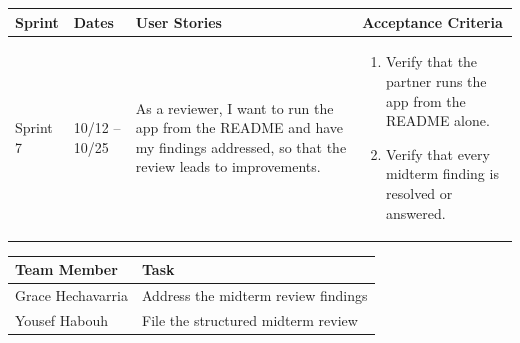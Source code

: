 \documentclass[12pt]{article}
\begin{document}
\noindent\begin{minipage}{\linewidth}

\vspace{0.5em}
\noindent
\begin{tabular}{|L{1.2cm}|L{1.8cm}|L{5.2cm}|L{6.3cm}|}
\hline
\textbf{Sprint} & \textbf{Dates} & \textbf{User Stories} & \textbf{Acceptance Criteria} \\
\hline
Sprint 7 & 10/12 -- 10/25 &
As a reviewer, I want to run the app from the README and have my findings addressed, so that the review leads to improvements. &
\begin{enumerate}
    \item Verify that the partner runs the app from the README alone.
    \item Verify that every midterm finding is resolved or answered.
\end{enumerate} \\
\hline
\end{tabular}

\vspace{0.5em}
\noindent
\begin{tabular}{|L{3.4cm}|L{11.6cm}|}
\hline
\textbf{Team Member} & \textbf{Task} \\
\hline
Grace Hechavarria & Address the midterm review findings \\
\hline
Yousef Habouh & File the structured midterm review \\
\hline
\end{tabular}
\end{minipage}

\vspace{1.5em}
\end{document}
